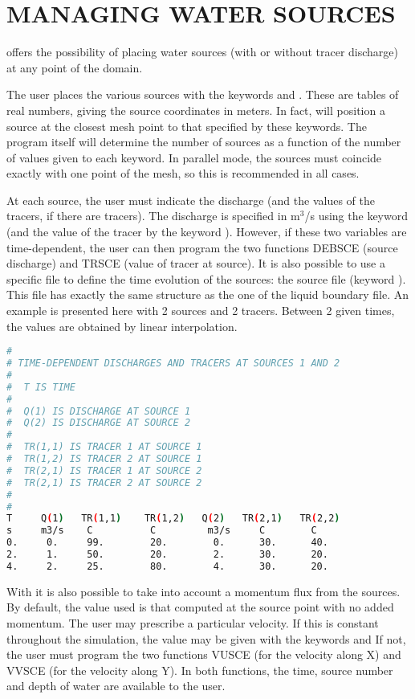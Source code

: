 


\chapter{MANAGING WATER SOURCES}
\label{ch:manag:ws}
  offers the possibility of placing water sources (with or without tracer discharge) at any point of the domain.

 The user places the various sources with the keywords  and . These are tables of real numbers, giving the source coordinates in meters. In fact,  will position a source at the closest mesh point to that specified by these keywords. The program itself will determine the number of sources as a function of the number of values given to each keyword. In parallel mode, the sources must coincide exactly with one point of the mesh, so this is recommended in all cases.

 At each source, the user must indicate the discharge (and the values of the tracers, if there are tracers). The discharge is specified in m${}^{3}$/s using the keyword  (and the value of the tracer by the keyword ). However, if these two variables are time-dependent, the user can then program the two functions DEBSCE (source discharge) and TRSCE (value of tracer at source). It is also possible to use a specific file to define the time evolution of the sources: the source file (keyword ). This file has exactly the same structure as the one of the liquid boundary file. An example is presented here with 2 sources and 2 tracers. Between 2 given times, the values are obtained by linear interpolation.
\begin{lstlisting}[language=bash]
#
# TIME-DEPENDENT DISCHARGES AND TRACERS AT SOURCES 1 AND 2
#
#  T IS TIME
#
#  Q(1) IS DISCHARGE AT SOURCE 1
#  Q(2) IS DISCHARGE AT SOURCE 2
#
#  TR(1,1) IS TRACER 1 AT SOURCE 1
#  TR(1,2) IS TRACER 2 AT SOURCE 1
#  TR(2,1) IS TRACER 1 AT SOURCE 2
#  TR(2,1) IS TRACER 2 AT SOURCE 2
#
#
T     Q(1)   TR(1,1)    TR(1,2)   Q(2)   TR(2,1)   TR(2,2)
s     m3/s    C          C         m3/s     C        C
0.     0.     99.        20.        0.      30.      40.
2.     1.     50.        20.        2.      30.      20.
4.     2.     25.        80.        4.      30.      20.
\end{lstlisting}
 With  it is also possible to take into account a momentum flux from the sources. By default, the value used is that computed at the source point with no added momentum. The user may prescribe a particular velocity. If this is constant throughout the simulation, the value may be given with the keywords  and  If not, the user must program the two functions VUSCE (for the velocity along X) and VVSCE (for the velocity along Y). In both functions, the time, source number and depth of water are available to the user.

